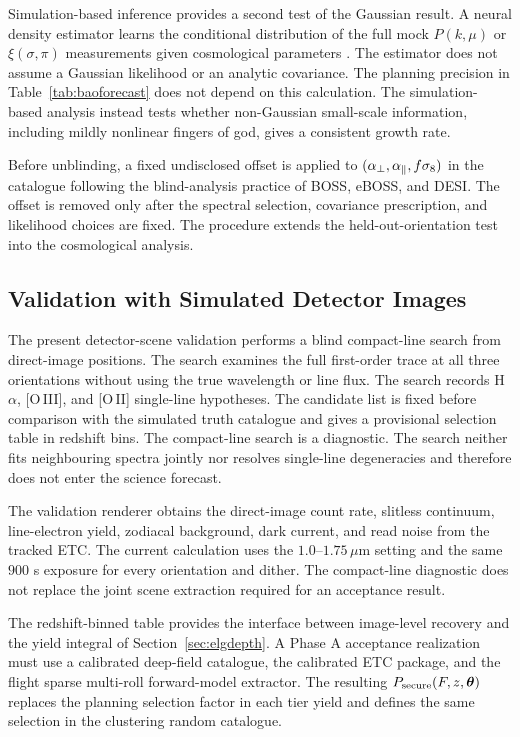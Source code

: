 Simulation-based inference provides a second test of the Gaussian result. A neural density estimator learns the conditional distribution of the full mock $P(k,\mu)$ or $\xi(\sigma,\pi)$ measurements given cosmological parameters \cite{cranmer2020}. The estimator does not assume a Gaussian likelihood or an analytic covariance. The planning precision in Table~\ref{tab:baoforecast} does not depend on this calculation. The simulation-based analysis instead tests whether non-Gaussian small-scale information, including mildly nonlinear fingers of god, gives a consistent growth rate.

Before unblinding, a fixed undisclosed offset is applied to $(\alpha_\perp,\alpha_\parallel,f\sigma_8)$ in the catalogue following the blind-analysis practice of BOSS, eBOSS, and DESI. The offset is removed only after the spectral selection, covariance prescription, and likelihood choices are fixed. The procedure extends the held-out-orientation test into the cosmological analysis.

\subsection{Validation with Simulated Detector Images}\label{sec:e2eval}

The present detector-scene validation performs a blind compact-line search from direct-image positions. The search examines the full first-order trace at all three orientations without using the true wavelength or line flux. The search records H$\alpha$, [O\,III], and [O\,II] single-line hypotheses. The candidate list is fixed before comparison with the simulated truth catalogue and gives a provisional selection table in redshift bins. The compact-line search is a diagnostic. The search neither fits neighbouring spectra jointly nor resolves single-line degeneracies and therefore does not enter the science forecast.

The validation renderer obtains the direct-image count rate, slitless continuum, line-electron yield, zodiacal background, dark current, and read noise from the tracked ETC. The current calculation uses the $1.0$--$1.75\,\mu$m setting and the same $900$ s exposure for every orientation and dither. The compact-line diagnostic does not replace the joint scene extraction required for an acceptance result.

The redshift-binned table provides the interface between image-level recovery and the yield integral of Section~\ref{sec:elgdepth}. A Phase A acceptance realization must use a calibrated deep-field catalogue, the calibrated ETC package, and the flight sparse multi-roll forward-model extractor. The resulting $P_{\rm secure}(F,z,\boldsymbol{\theta})$ replaces the planning selection factor in each tier yield and defines the same selection in the clustering random catalogue.

